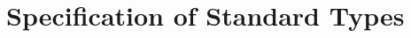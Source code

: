 \chapter{Specification of Standard Types}
\label{appendix-standard-types}
\lstset{
basicstyle=\ttfamily\small
}
